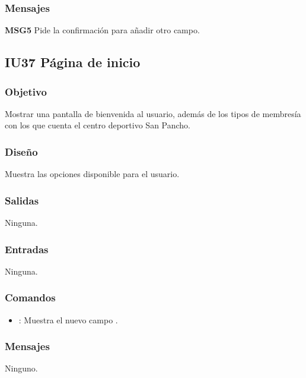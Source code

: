 \subsubsection{Mensajes}
	\begin{Citemize}
		\item {\bf MSG5} Pide la confirmación para añadir otro campo.
	\end{Citemize}


\subsection{IU37 Página de inicio}

\subsubsection{Objetivo}
	Mostrar una pantalla de bienvenida al usuario, además de los tipos de membresía con los que cuenta el centro deportivo San Pancho.

\subsubsection{Diseño}
	Muestra las opciones disponible para el usuario.


\subsubsection{Salidas}

	Ninguna.

\subsubsection{Entradas}
	Ninguna.

\subsubsection{Comandos}
\begin{itemize}
	\item {}: Muestra el nuevo campo .
\end{itemize}

\subsubsection{Mensajes}
	\begin{Citemize}
		\item Ninguno.
	\end{Citemize}
	
